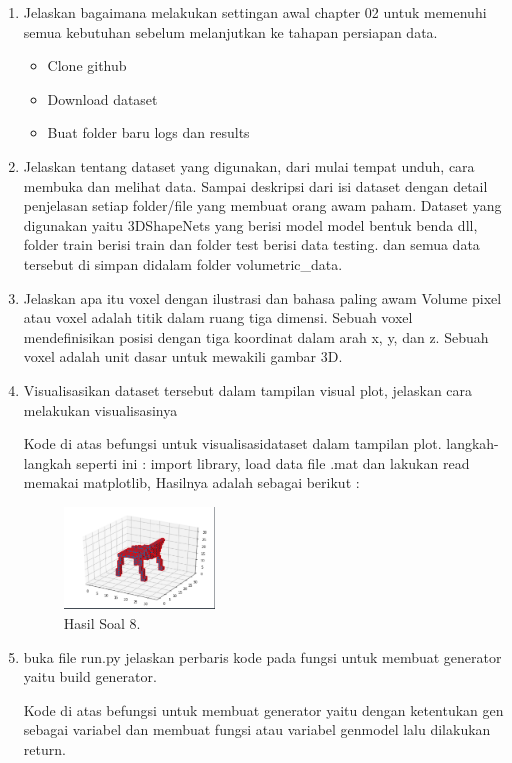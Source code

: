 \begin{enumerate}
	\item Jelaskan bagaimana melakukan settingan awal chapter 02 untuk memenuhi semua kebutuhan sebelum melanjutkan ke tahapan persiapan data.
    \hfill\break
    \begin{itemize}
		\item Clone github
		\item Download dataset
		\item Buat folder baru logs dan results
	\end{itemize}

	\item Jelaskan tentang dataset yang digunakan, dari mulai tempat unduh, cara membuka dan melihat data. Sampai deskripsi dari isi dataset dengan detail penjelasan setiap folder/ﬁle yang membuat orang awam paham.
    \hfill\break
    Dataset yang digunakan yaitu 3DShapeNets yang berisi model model bentuk benda dll, folder train berisi train dan folder test berisi data testing. dan semua data tersebut di simpan didalam folder volumetric\_data.
	
	\item Jelaskan apa itu voxel dengan ilustrasi dan bahasa paling awam
    \hfill\break
    Volume pixel atau voxel adalah titik dalam ruang tiga dimensi. Sebuah voxel mendeﬁnisikan posisi dengan tiga koordinat dalam arah x, y, dan z. Sebuah voxel adalah unit dasar untuk mewakili gambar 3D.

	\item Visualisasikan dataset tersebut dalam tampilan visual plot, jelaskan cara melakukan visualisasinya
    \hfill\break
    
    Kode di atas befungsi untuk visualisasidataset dalam tampilan plot. langkah-langkah seperti ini :
    import library, load data file .mat dan lakukan read memakai matplotlib, Hasilnya adalah sebagai berikut :
	\begin{figure}[H]
	\centering
		\includegraphics[width=4cm]{figures/1174077/8/p8.PNG}
		\caption{Hasil Soal 8.}
	\end{figure}

	\item buka ﬁle run.py jelaskan perbaris kode pada fungsi untuk membuat generator yaitu build generator.
	\hfill\break
	
	Kode di atas befungsi untuk membuat generator yaitu dengan ketentukan gen sebagai variabel dan membuat fungsi atau variabel genmodel lalu dilakukan return. 


\end{enumerate}

